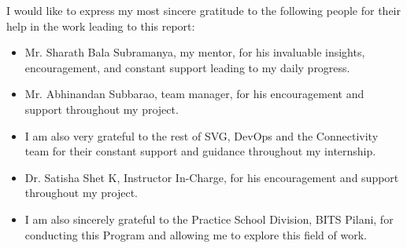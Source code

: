 \documentclass[11pt, a4paper, oneside]{Thesis} %
\title{\ttitle} %
\begin{document}
\frontmatter %


\fancyhead{} %
\rhead{\thepage} %
\lhead{} %

\pagestyle{fancy} %


\makeatletter
\newcommand*\@lbracket{[}
\newcommand*\@rbracket{]}
\newcommand*\@colon{:}
\newcommand*\colorIndex{%
    \edef\@temp{\the\lst@token}%
    \ifx\@temp\@lbracket \color{black}%
    \else\ifx\@temp\@rbracket \color{black}%
        \else\ifx\@temp\@colon \color{black}%
            \else \color{vorange}%
            \fi\fi\fi
}
\makeatother
\maketitle
\titleP
{} %

\AbstractSheet

\begin{acknowledgements}
    I would like to express my most sincere gratitude to the following people for their help in the work leading to this report:
    \begin{itemize}
        \item Mr. Sharath Bala Subramanya, my mentor, for his invaluable insights, encouragement, and constant support leading to my daily progress.
        \item Mr. Abhinandan Subbarao, team manager, for his encouragement and support throughout my project.
        \item I am also very grateful to the rest of SVG, DevOps and the Connectivity team for their constant support and guidance throughout my internship.
        \item Dr. Satisha Shet K, Instructor In-Charge, for his encouragement and support throughout my project.
        \item I am also sincerely grateful to the Practice School Division, BITS Pilani, for conducting this Program and allowing me to explore this field of work.
    \end{itemize}

\end{acknowledgements}
\end{document}
